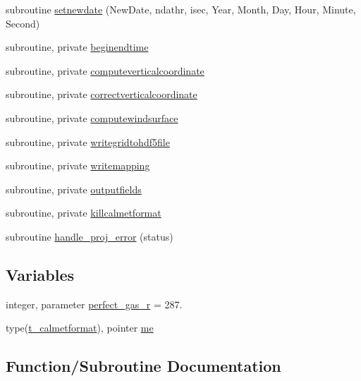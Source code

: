 \begin{DoxyCompactItemize}
subroutine \mbox{\hyperlink{namespacemodulecalmetformat_a3defaeb10661bad427bb6a70e331c077}{setnewdate}} (New\+Date, ndathr, isec, Year, Month, Day, Hour, Minute, Second)
\item 
subroutine, private \mbox{\hyperlink{namespacemodulecalmetformat_a62bd4a5f15fb34c0505c736e02ac62ca}{beginendtime}}
\item 
subroutine, private \mbox{\hyperlink{namespacemodulecalmetformat_abd990931d70766e3d45c4c5e94a1924f}{computeverticalcoordinate}}
\item 
subroutine, private \mbox{\hyperlink{namespacemodulecalmetformat_aebd4c52189e33c42d4eddb372d91a66d}{correctverticalcoordinate}}
\item 
subroutine, private \mbox{\hyperlink{namespacemodulecalmetformat_ac65fd3f15792bec4c3a1f8809e7d201a}{computewindsurface}}
\item 
subroutine, private \mbox{\hyperlink{namespacemodulecalmetformat_a49e8d2600dc3c064290f04ab142db105}{writegridtohdf5file}}
\item 
subroutine, private \mbox{\hyperlink{namespacemodulecalmetformat_ab777b0fc84a3a4b2505fadc6db40580f}{writemapping}}
\item 
subroutine, private \mbox{\hyperlink{namespacemodulecalmetformat_a77546a7a587e6ab71724b1a5ebb7e709}{outputfields}}
\item 
subroutine, private \mbox{\hyperlink{namespacemodulecalmetformat_a7703da81b5a94320621a668c0326f881}{killcalmetformat}}
\item 
subroutine \mbox{\hyperlink{namespacemodulecalmetformat_a2e6285b2b96d5b3545d7755b77b65502}{handle\+\_\+proj\+\_\+error}} (status)
\end{DoxyCompactItemize}
\subsection*{Variables}
\begin{DoxyCompactItemize}
\item 
integer, parameter \mbox{\hyperlink{namespacemodulecalmetformat_a21173190f31cd07dd3e9d96b03a51822}{perfect\+\_\+gas\+\_\+r}} = 287.
\item 
type(\mbox{\hyperlink{structmodulecalmetformat_1_1t__calmetformat}{t\+\_\+calmetformat}}), pointer \mbox{\hyperlink{namespacemodulecalmetformat_a30d8b055512bccb5b1dd9cd00e4c790b}{me}}
\end{DoxyCompactItemize}


\subsection{Function/\+Subroutine Documentation}
\mbox{\label{namespacemodulecalmetformat_ac2b80a87e09960dca9aab0ddc8af00b5}} 
